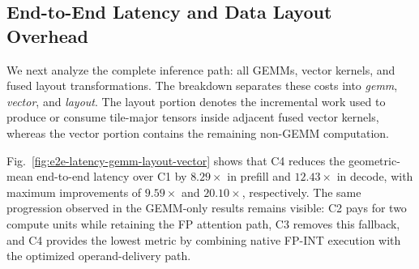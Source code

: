 \documentclass[sigconf,anonymous,nonacm]{acmart}
\newcommand{\fpint}{FP-INT}
\begin{document}
\subsection{End-to-End Latency and Data Layout Overhead}

We next analyze the complete inference path: all GEMMs, vector kernels, and fused layout transformations. The breakdown separates these costs into \emph{gemm}, \emph{vector}, and \emph{layout}. The layout portion denotes the incremental work used to produce or consume tile-major tensors inside adjacent fused vector kernels, whereas the vector portion contains the remaining non-GEMM computation.

Fig.~\ref{fig:e2e-latency-gemm-layout-vector} shows that C4 reduces the geometric-mean end-to-end latency over C1 by $8.29\times$ in prefill and $12.43\times$ in decode, with maximum improvements of $9.59\times$ and $20.10\times$, respectively. The same progression observed in the GEMM-only results remains visible: C2 pays for two compute units while retaining the FP attention path, C3 removes this fallback, and C4 provides the lowest metric by combining native \fpint{} execution with the optimized operand-delivery path.

\end{document}
